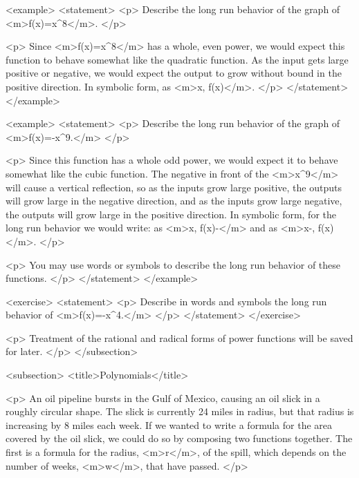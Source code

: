         <example>
            <statement>
                <p>
                    Describe the long run behavior of the graph of <m>f(x)=x^{8}</m>.
                </p>

                <p>
                    Since <m>f(x)=x^{8}</m> has a whole, even power, we would expect this function to behave somewhat like the quadratic function.
                    As the input gets large positive or negative, we would expect the output to grow without bound in the positive direction.
                    In symbolic form, as <m>x\rightarrow \pm \infty, f(x)\rightarrow \infty</m>.
                </p>
            </statement>
        </example>

        <example>
            <statement>
                <p>
                    Describe the long run behavior of the graph of <m>f(x)=-x^{9}.</m>
                </p>

                <p>
                    Since this function has a whole odd power, we would expect it to behave somewhat like the cubic function.
                    The negative in front of the <m>x^{9}</m> will cause a vertical reflection, so as the inputs grow large positive, the outputs will grow large in the negative direction, and as the inputs grow large negative, the outputs will grow large in the positive direction.
                    In symbolic form, for the long run behavior we would write: as <m>x\rightarrow \infty, f(x)\rightarrow-\infty</m> and as <m>x\rightarrow -\infty, f(x)\rightarrow\infty</m>.
                </p>

                <p>
                    You may use words or symbols to describe the long run behavior of these functions.
                </p>
            </statement>
        </example>

        <exercise>
            <statement>
                <p>
                    Describe in words and symbols the long run behavior of <m>f(x)=-x^{4}.</m>
                </p>
            </statement>
        </exercise>

        <p>
            Treatment of the rational and radical forms of power functions will be saved for later.
        </p>
    </subsection>


    <subsection>
        <title>Polynomials</title>

        <p>
            An oil pipeline bursts in the Gulf of Mexico, causing an oil slick in a roughly circular shape.
            The slick is currently 24 miles in radius, but that radius is increasing by 8 miles each week.
            If we wanted to write a formula for the area covered by the oil slick, we could do so by composing two functions together.
            The first is a formula for the radius, <m>r</m>, of the spill, which depends on the number of weeks, <m>w</m>, that have passed.
        </p>


